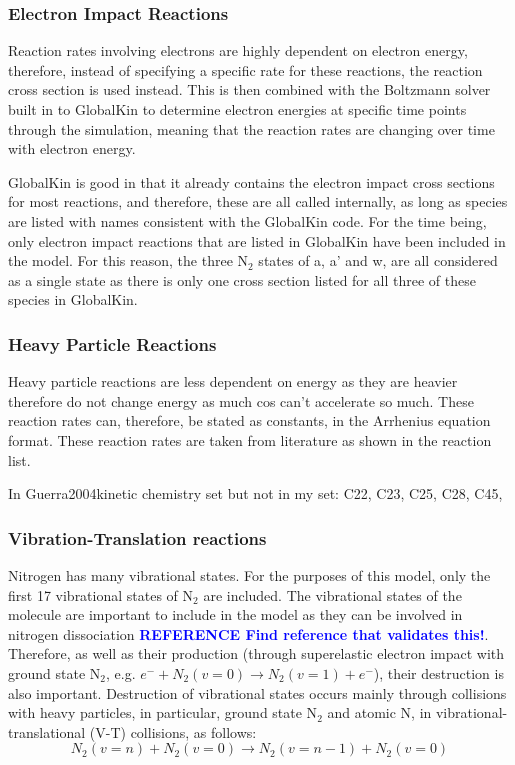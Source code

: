 \documentclass[11pt, oneside]{article}   	%
\newcommand{\toref}[1]{ \textcolor{blue}{\bf{REFERENCE #1}}}
\begin{document}
\subsubsection{Electron Impact Reactions}
Reaction rates involving electrons are highly dependent on electron energy, therefore, instead of specifying a specific rate for these reactions, the reaction cross section is used instead.
This is then combined with the Boltzmann solver built in to GlobalKin to determine electron energies at specific time points through the simulation, meaning that the reaction rates are changing over time with electron energy.

GlobalKin is good in that it already contains the electron impact cross sections for most reactions, and therefore, these are all called internally, as long as species are listed with names consistent with the GlobalKin code.
For the time being, only electron impact reactions that are listed in GlobalKin have been included in the model. 
For this reason, the three N$_2$ states of a, a' and w, are all considered as a single state as there is only one cross section listed for all three of these species in GlobalKin.

\subsubsection{Heavy Particle Reactions}
Heavy particle reactions are less dependent on energy as they are heavier therefore do not change energy as much cos can't accelerate so much.
These reaction rates can, therefore, be stated as constants, in the Arrhenius equation format.
These reaction rates are taken from literature as shown in the reaction list.

In Guerra2004kinetic chemistry set but not in my set:
C22, C23, C25, C28, C45, 

\subsubsection{Vibration-Translation reactions}
Nitrogen has many vibrational states.
For the purposes of this model, only the first 17 vibrational states of N$_2$ are included.
The vibrational states of the molecule are important to include in the model as they can be involved in nitrogen dissociation \toref{Find reference that validates this!}.
Therefore, as well as their production (through superelastic electron impact with ground state N$_2$, e.g. $e^- + N_2(v=0) \rightarrow N_2(v=1) + e^-$), their destruction is also important.
Destruction of vibrational states occurs mainly through collisions with heavy particles, in particular, ground state N$_2$ and atomic N, in vibrational-translational (V-T) collisions, as follows:
\begin{equation}
N_2(v=n) + N_2 (v=0) \rightarrow N_2(v=n-1) + N_2(v=0)
\label{eqn:V-T}
\end{equation}
\end{document}
